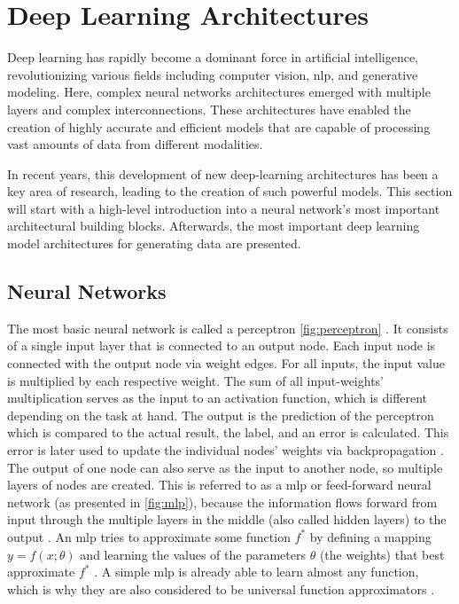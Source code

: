 \section{Deep Learning Architectures}
\label{ch:preliminaries-deepLearningArchitectures}

Deep learning has rapidly become a dominant force in artificial intelligence, revolutionizing various fields including computer vision, \gls{nlp}, and generative modeling. 
Here, complex neural networks architectures emerged with multiple layers and complex interconnections.
These architectures have enabled the creation of highly accurate and efficient models that are capable of processing vast amounts of data from different modalities.

In recent years, this development of new deep-learning architectures has been a key area of research, leading to the creation of such powerful models.
This section will start with a high-level introduction into a neural network's most important architectural building blocks.
Afterwards, the most important deep learning model architectures for generating data are presented.

\subsection{Neural Networks}
\label{ch:preliminaries-deepLearningArchitectures-neuralNetworks}

The most basic neural network is called a perceptron \autoref{fig:perceptron} \cite{rosenblatt1958PerceptronProbabilisticModel}.
It consists of a single input layer that is connected to an output node.
Each input node is connected with the output node via weight edges.
For all inputs, the input value is multiplied by each respective weight.
The sum of all input-weights' multiplication serves as the input to an activation function, which is different depending on the task at hand.
The output is the prediction of the perceptron which is compared to the actual result, the label, and an error is calculated.
This error is later used to update the individual nodes' weights via backpropagation \cite{aggarwal2018NeuralNetworksDeep}.
The output of one node can also serve as the input to another node, so multiple layers of nodes are created.
This is referred to as a \gls{mlp} or feed-forward neural network (as presented in \autoref{fig:mlp}), 
because the information flows forward from input through the multiple layers in the middle (also called hidden layers) to the output \cite{aggarwal2018NeuralNetworksDeep, Goodfellow-et-al-2016}.
An \gls{mlp} tries to approximate some function $f^*$ by defining a mapping $y=f(x;\theta)$ and learning the values of the parameters $\theta$ (\ie the weights) that best approximate $f^*$ \cite{Goodfellow-et-al-2016}.
A simple \gls{mlp} is already able to learn almost any function, which is why they are also considered to be universal function approximators \cite{aggarwal2018NeuralNetworksDeep, hornik1989MultilayerFeedforwardNetworks}.


